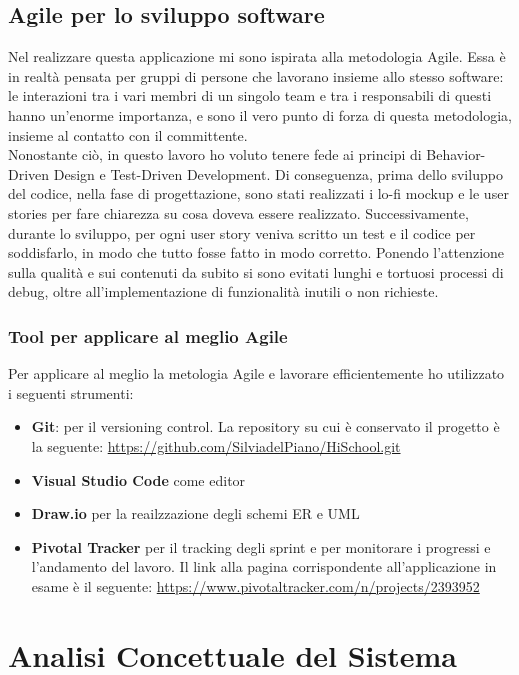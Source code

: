 \documentclass[Lau, binding=0.6cm, oneside]{sapthesis}
\begin{document}
\section{Agile per lo sviluppo software} \label{agile}

Nel realizzare questa applicazione mi sono ispirata alla metodologia Agile. Essa è in realtà pensata per gruppi di persone che lavorano insieme allo stesso software: le interazioni tra i vari membri di un singolo team e tra i responsabili di questi hanno un'enorme importanza, e sono il vero punto di forza di questa metodologia, insieme al contatto con il committente.\\
Nonostante ciò, in questo lavoro ho voluto tenere fede ai principi di Behavior-Driven Design e Test-Driven Development. Di conseguenza, prima dello sviluppo del codice, nella fase di progettazione, sono stati realizzati i lo-fi mockup e le user stories per fare chiarezza su cosa doveva essere realizzato. Successivamente, durante lo sviluppo, per ogni user story veniva scritto un test e il codice per soddisfarlo, in modo che tutto fosse fatto in modo corretto. Ponendo l'attenzione sulla qualità e sui contenuti da subito si sono evitati lunghi e tortuosi processi di debug, oltre all'implementazione di funzionalità inutili o non richieste.

\subsection{Tool per applicare al meglio Agile}

Per applicare al meglio la metologia Agile e lavorare efficientemente ho utilizzato i seguenti strumenti:

\begin{itemize}
	\item \textbf{Git}: per il versioning control. La repository su cui è conservato il progetto è la seguente: \url{https://github.com/SilviadelPiano/HiSchool.git}
	\item \textbf{Visual Studio Code} come editor
	\item \textbf{Draw.io} per la reailzzazione degli schemi ER e UML
	\item \textbf{Pivotal Tracker} per il tracking degli sprint e per monitorare i progressi e l'andamento del lavoro. Il link alla pagina corrispondente all'applicazione in esame è il seguente: \url{https://www.pivotaltracker.com/n/projects/2393952}
\end{itemize}

\chapter{Analisi Concettuale del Sistema}
\end{document}
